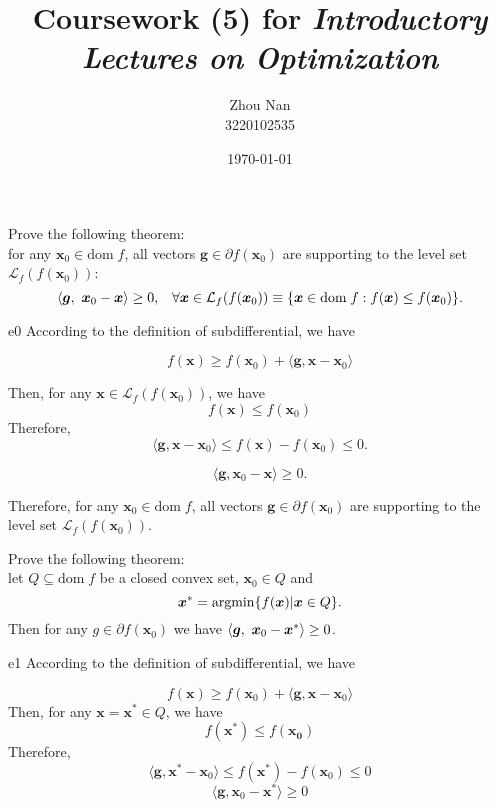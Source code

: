 \documentclass{article}
\title{Coursework (5) for \emph{Introductory Lectures on Optimization}}
\author{Zhou Nan \\ 3220102535}
\date{\today}
\newcommand{\xB}{\bm{x}}
\newcommand{\gB}{\bm{g}}
\newcommand{\LM}{\mathcal{L}}
\newcommand{\domf}{\textrm{dom}\;f}
\newcommand{\argmin}{\mathop{\rm argmin}}
\begin{document}
\maketitle

\begin{excercise}\label{e0}
Prove the following theorem: \\
for any $\xB_0 \in \domf$, all vectors $\gB \in \partial f(\xB_0)$ are supporting to the level set $\LM_f (f(\xB_0))$:
\begin{equation}
	\innerproduct{\gB}{\xB_0 - \xB} \geq 0, \;\;\; \forall \xB \in \LM_f(f(\xB_0)) \equiv \{ \xB \in \domf: f(\xB) \leq f(\xB_0) \}.\nonumber
\end{equation}
\end{excercise}
\begin{PROOF}{e0}
	According to the definition of subdifferential, we have

	\[
	f(\bm{x}) \geq f(\bm{x}_0) + \langle \bm{g}, \bm{x} - \bm{x}_0 \rangle
	\]
	
	Then, for any \(\bm{x} \in \mathcal{L}_f(f(\bm{x}_0))\), we have
	\[
		f(\bm{x}) \leq f(\bm{x}_0)
	\]
	Therefore,
	\[
	\langle \bm{g}, \bm{x} - \bm{x}_0 \rangle \leq f(\bm{x}) - f(\bm{x}_0) \leq 0.
	\]
	
	\[
	\langle \bm{g}, \bm{x}_0 - \bm{x} \rangle \geq 0.
	\]
	
	Therefore, for any $\xB_0 \in \domf$, all vectors $\gB \in \partial f(\xB_0)$ are supporting to the level set $\LM_f (f(\xB_0))$.
\end{PROOF}

\begin{excercise}\label{e1}
Prove the following theorem: \\
let $Q \subseteq \domf$ be a closed convex set,  $\xB_0 \in Q$ and 
 \begin{equation}
 	\xB^* = \argmin \{ f(\xB) | \xB \in Q \}.\nonumber
 \end{equation}
 Then for any $g \in \partial f(\xB_0)$ we have $\innerproduct{\gB}{\xB_0 - \xB^*} \geq 0$.
\end{excercise}
\begin{PROOF}{e1}
	According to the definition of subdifferential, we have

	\[
	f(\bm{x}) \geq f(\bm{x}_0) + \langle \bm{g}, \bm{x} - \bm{x}_0 \rangle
	\]
	Then, for any $\bm{x} = \xB^* \in Q$, we have
	\[
	f(\bm{x}^*) \leq f(\bm{x_0})
	\]
	Therefore,
	\[
	\langle \bm{g}, \bm{x}^* - \bm{x}_0 \rangle \leq f(\bm{x}^*) - f(\bm{x}_0) \leq 0
	\]
	\[
	\langle \bm{g}, \bm{x}_0 - \bm{x}^* \rangle \geq 0
	\]
\end{PROOF}
\end{document}
